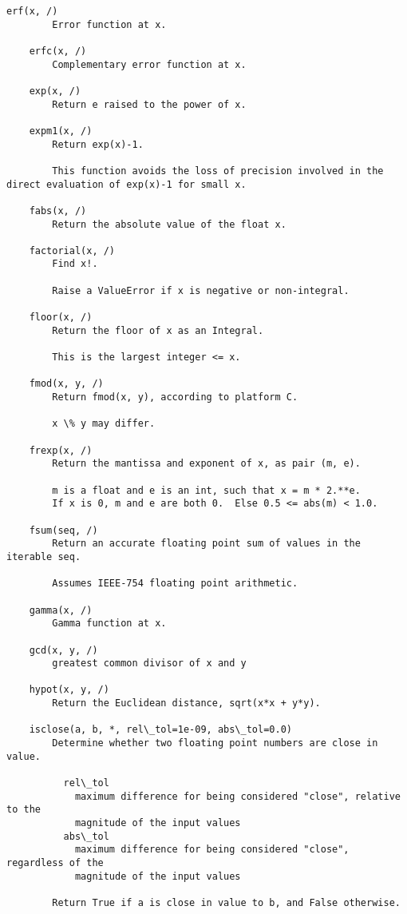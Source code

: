 \documentclass[11pt]{article}
\begin{document}
\begin{Verbatim}[commandchars=\\\{\}]
    erf(x, /)
        Error function at x.
    
    erfc(x, /)
        Complementary error function at x.
    
    exp(x, /)
        Return e raised to the power of x.
    
    expm1(x, /)
        Return exp(x)-1.
        
        This function avoids the loss of precision involved in the direct evaluation of exp(x)-1 for small x.
    
    fabs(x, /)
        Return the absolute value of the float x.
    
    factorial(x, /)
        Find x!.
        
        Raise a ValueError if x is negative or non-integral.
    
    floor(x, /)
        Return the floor of x as an Integral.
        
        This is the largest integer <= x.
    
    fmod(x, y, /)
        Return fmod(x, y), according to platform C.
        
        x \% y may differ.
    
    frexp(x, /)
        Return the mantissa and exponent of x, as pair (m, e).
        
        m is a float and e is an int, such that x = m * 2.**e.
        If x is 0, m and e are both 0.  Else 0.5 <= abs(m) < 1.0.
    
    fsum(seq, /)
        Return an accurate floating point sum of values in the iterable seq.
        
        Assumes IEEE-754 floating point arithmetic.
    
    gamma(x, /)
        Gamma function at x.
    
    gcd(x, y, /)
        greatest common divisor of x and y
    
    hypot(x, y, /)
        Return the Euclidean distance, sqrt(x*x + y*y).
    
    isclose(a, b, *, rel\_tol=1e-09, abs\_tol=0.0)
        Determine whether two floating point numbers are close in value.
        
          rel\_tol
            maximum difference for being considered "close", relative to the
            magnitude of the input values
          abs\_tol
            maximum difference for being considered "close", regardless of the
            magnitude of the input values
        
        Return True if a is close in value to b, and False otherwise.
        

\end{Verbatim}
\end{document}
